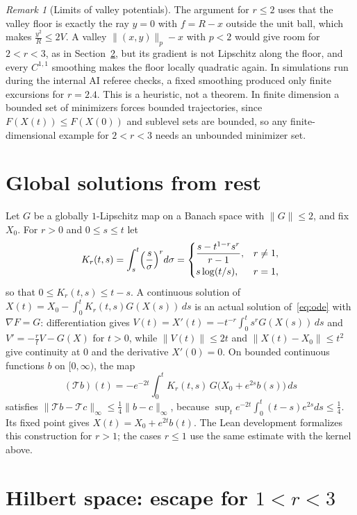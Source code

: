 \documentclass[11pt]{article}
\numberwithin{equation}{section}
\theoremstyle{definition}
\theoremstyle{remark}
\newtheorem{remark}[theorem]{Remark}
\newcommand{\norm}[1]{\lVert #1\rVert}
\begin{document}
\begin{remark}[Limits of valley potentials]\label{rem:valleys}
The argument for $r\le2$ uses that the valley floor is exactly the ray $y=0$ with $f=R-x$ outside the unit ball, which makes $\frac{y^2}{R}\le2V$. A valley $\norm{(x,y)}_p-x$ with $p<2$ would give room for $2<r<3$, as in Section~\ref{sec:hilbert}, but its gradient is not Lipschitz along the floor, and every $C^{1,1}$ smoothing makes the floor locally quadratic again. In simulations run during the internal AI referee checks, a fixed smoothing produced only finite excursions for $r=2.4$. This is a heuristic, not a theorem. In finite dimension a bounded set of minimizers forces bounded trajectories, since $F(X(t))\le F(X(0))$ and sublevel sets are bounded, so any finite-dimensional example for $2<r<3$ needs an unbounded minimizer set.
\end{remark}

\section{Global solutions from rest}\label{sec:existence}
Let $G$ be a globally $1$-Lipschitz map on a Banach space with $\norm G\le2$, and fix $X_0$. For $r>0$ and $0\le s\le t$ let
\[
K_r(t,s)=\int_s^t\Bigl(\frac s\sigma\Bigr)^rd\sigma=\begin{cases}\dfrac{s-t^{1-r}s^r}{r-1},&r\ne1,\\[1ex] s\log(t/s),&r=1,\end{cases}
\]
so that $0\le K_r(t,s)\le t-s$. A continuous solution of $X(t)=X_0-\int_0^tK_r(t,s)G(X(s))\,ds$ is an actual solution of~\eqref{eq:ode} with $\nabla F=G$: differentiation gives $V(t)=X'(t)=-t^{-r}\int_0^ts^rG(X(s))\,ds$ and $V'=-\frac rtV-G(X)$ for $t>0$, while $\norm{V(t)}\le2t$ and $\norm{X(t)-X_0}\le t^2$ give continuity at $0$ and the derivative $X'(0)=0$. On bounded continuous functions $b$ on $[0,\infty)$, the map
\[
(\mathcal Tb)(t)=-e^{-2t}\int_0^tK_r(t,s)\,G\bigl(X_0+e^{2s}b(s)\bigr)\,ds
\]
satisfies $\norm{\mathcal Tb-\mathcal Tc}_\infty\le\frac14\norm{b-c}_\infty$, because $\sup_te^{-2t}\int_0^t(t-s)e^{2s}ds\le\frac14$. Its fixed point gives $X(t)=X_0+e^{2t}b(t)$. The Lean development formalizes this construction for $r>1$; the cases $r\le1$ use the same estimate with the kernel above.

\section{Hilbert space: escape for \texorpdfstring{$1<r<3$}{1 < r < 3}}\label{sec:hilbert}
\end{document}
